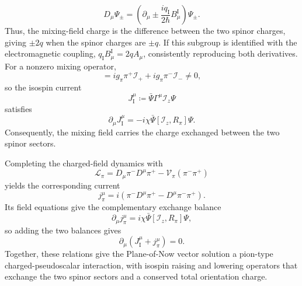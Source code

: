\begin{equation}
    D_{\mu}\Psi_{\pm}=\left(\partial_{\mu}\pm\frac{iq_{\mathrm I}}{2\hbar}B_{\mu}^{\mathrm I}\right)\Psi_{\pm}.
\end{equation}
Thus, the mixing-field charge is the difference between the two spinor charges, giving $\pm2q$ when the spinor charges are $\pm q$. If this subgroup is identified with the electromagnetic coupling, $q_{\mathrm I}B_{\mu}^{\mathrm I}=2qA_{\mu}$, consistently reproducing both derivatives. For a nonzero mixing operator,
\begin{equation}
    [\mathcal{I}_{z}, R_{\pi}] = ig_{\pi}\pi^{+}\mathcal{I}_{+} + ig_{\pi}\pi^{-}\mathcal{I}_{-} \neq 0,
\end{equation}
so the isospin current
\begin{equation}
    J_{\mathrm{I}}^{\mu} \coloneqq \bar{\Psi}\Gamma^{\mu}\mathcal{I}_{z}\Psi
\end{equation}
satisfies
\begin{equation}\label{eq_pion_isospin_exchange}
    \partial_{\mu}J_{\mathrm{I}}^{\mu} = -i\chi\bar{\Psi}[\mathcal{I}_{z}, R_{\pi}]\Psi.
\end{equation}
Consequently, the mixing field carries the charge exchanged between the two spinor sectors.

Completing the charged-field dynamics with
\begin{equation}
    \mathcal{L}_{\pi} = D_{\mu}\pi^{-}D^{\mu}\pi^{+} - \mathcal{V}_{\pi}\left(\pi^{-}\pi^{+}\right)
\end{equation}
yields the corresponding current
\begin{equation}
    j_{\pi}^{\mu} = i\left(\pi^{-}D^{\mu}\pi^{+} - D^{\mu}\pi^{-}\pi^{+}\right).
\end{equation}
Its field equations give the complementary exchange balance
\begin{equation}
    \partial_{\mu}j_{\pi}^{\mu} = i\chi\bar{\Psi}[\mathcal{I}_{z}, R_{\pi}]\Psi,
\end{equation}
so adding the two balances gives
\begin{equation}\label{eq_total_pion_isospin_conservation}
    \partial_{\mu}\left(J_{\mathrm{I}}^{\mu} + j_{\pi}^{\mu}\right) = 0.
\end{equation}
Together, these relations give the Plane-of-Now vector solution a pion-type charged-pseudoscalar interaction, with isospin raising and lowering operators that exchange the two spinor sectors and a conserved total orientation charge.

